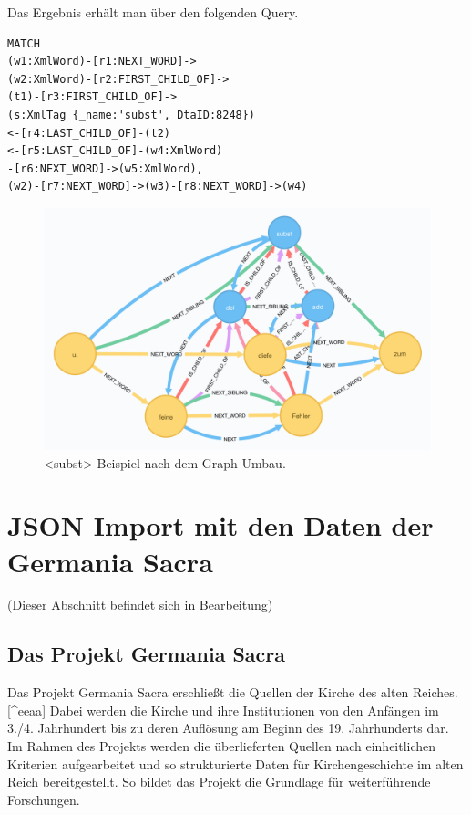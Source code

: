 \documentclass[ngerman,]{scrreprt}
\begin{document}
Das Ergebnis erhält man über den folgenden Query.

\begin{verbatim}
MATCH
(w1:XmlWord)-[r1:NEXT_WORD]->
(w2:XmlWord)-[r2:FIRST_CHILD_OF]->
(t1)-[r3:FIRST_CHILD_OF]->
(s:XmlTag {_name:'subst', DtaID:8248})
<-[r4:LAST_CHILD_OF]-(t2)
<-[r5:LAST_CHILD_OF]-(w4:XmlWord)
-[r6:NEXT_WORD]->(w5:XmlWord),
(w2)-[r7:NEXT_WORD]->(w3)-[r8:NEXT_WORD]->(w4)
\end{verbatim}

\begin{figure}
\centering
\includegraphics{Bilder/TEI2Graph/subst-add-del-bearbeitet.png}
\caption{\textless{}subst\textgreater{}-Beispiel nach dem Graph-Umbau.}
\end{figure}

\chapter{JSON Import mit den Daten der Germania Sacra}\label{json-import-mit-den-daten-der-germania-sacra}

(Dieser Abschnitt befindet sich in Bearbeitung)

\section{Das Projekt Germania Sacra}\label{das-projekt-germania-sacra}

Das Projekt Germania Sacra erschließt die Quellen der Kirche des alten Reiches.{[}\^{}eeaa{]} Dabei werden die Kirche und ihre Institutionen von den Anfängen im 3./4. Jahrhundert bis zu deren Auflösung am Beginn des 19. Jahrhunderts dar. Im Rahmen des Projekts werden die überlieferten Quellen nach einheitlichen Kriterien aufgearbeitet und so strukturierte Daten für Kirchengeschichte im alten Reich bereitgestellt. So bildet das Projekt die Grundlage für weiterführende Forschungen.
\end{document}
